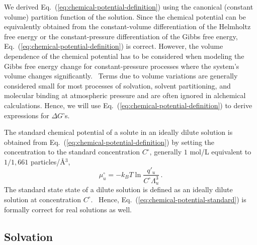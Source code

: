 \documentclass[9pt,bestpractices]{livecoms}
\begin{document}
We derived Eq.~(\ref{eq:chemical-potential-definition}) using the canonical (constant volume) partition function of the solution. Since the chemical potential can be equivalently obtained from the constant-volume differentiation of the Helmholtz free energy or the constant-pressure differentiation of the Gibbs free energy, Eq.~(\ref{eq:chemical-potential-definition}) is correct. However, the volume dependence of the chemical potential has to be considered when modeling the Gibbs free energy change for constant-pressure processes where the system's volume changes significantly.~\cite{gilson1997statisticalthermodynamic} Terms due to volume variations are generally considered small for most processes of solvation, solvent partitioning, and molecular binding at atmospheric pressure and are often ignored in alchemical calculations. Hence, we will use Eq.~(\ref{eq:chemical-potential-definition}) to derive expressions for $\Delta G$'s.

The standard chemical potential of a solute in an ideally dilute solution is obtained from Eq.~(\ref{eq:chemical-potential-definition}) by setting the concentration to the standard concentration $C^\circ$, generally $1$ mol/L equivalent to $1/1,661$ particles/\AA$^{3}$, 
\begin{equation}
  \mu_u^\circ = -k_B T \ln \frac{q'_u}{C^\circ \Lambda_u^3} \, .
  \label{eq:chemical-potential-standard}
\end{equation}
The standard state state of a dilute solution is defined as an ideally dilute solution at concentration $C^\circ$.~\cite{levine2009physicalchemistrybook6ed} Hence, Eq.~(\ref{eq:chemical-potential-standard}) is formally correct for real solutions as well.

\subsection{Solvation}\label{sec:theory-solvation}
\end{document}
